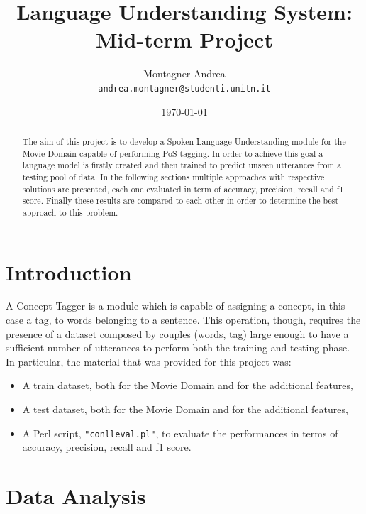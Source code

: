 \documentclass[11pt,a4paper]{article}
\title{Language Understanding System: Mid-term Project}
\author{Montagner Andrea \\
  {\tt andrea.montagner@studenti.unitn.it}}
\date{\today}
\begin{document}
\maketitle
\begin{abstract}
The aim of this project is to develop a Spoken Language Understanding module for the Movie Domain capable of performing PoS tagging. In order to achieve this goal a language model is firstly created and then trained to predict unseen utterances from a testing pool of data. In the following sections multiple approaches with respective solutions are presented, each one evaluated in term of accuracy, precision, recall and f1 score. Finally these results are compared to each other in order to determine the best approach to this problem.
\end{abstract}

\section{Introduction}

A Concept Tagger is a module which is capable of assigning a concept, in this case a tag, to words belonging to a sentence. This operation, though, requires the presence of a dataset composed by couples (words, tag) large enough to have a sufficient number of utterances to perform both the training and testing phase.\\
In particular, the material that was provided for this project was:
\begin{itemize}
	\item A train dataset, both for the Movie Domain and for the additional features,
	\item A test dataset, both for the Movie Domain and for the additional features,
	\item A Perl script, {\tt "conlleval.pl"}, to evaluate the performances in terms of accuracy, precision, recall and f1 score.
\end{itemize}


\section{Data Analysis}
\label{sec:datanalysis}
\end{document}
